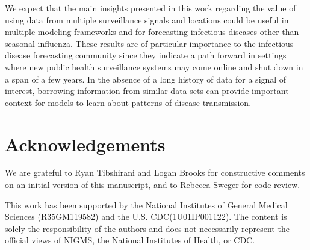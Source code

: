 \documentclass{article}\usepackage[]{graphicx}\usepackage[]{xcolor}
\begin{document}
We expect that the main insights presented in this work regarding the value of using data from multiple surveillance signals and locations could be useful in multiple modeling frameworks and for forecasting infectious diseases other than seasonal influenza. These results are of particular importance to the infectious disease forecasting community since they indicate a path forward in settings where new public health surveillance systems may come online and shut down in a span of a few years. In the absence of a long history of data for a signal of interest, borrowing information from similar data sets can provide important context for models to learn about patterns of disease transmission.

\section*{Acknowledgements}

We are grateful to Ryan Tibshirani and Logan Brooks for constructive comments on an initial version of this manuscript, and to Rebecca Sweger for code review.

This work has been supported by the National Institutes of General Medical Sciences (R35GM119582) and the U.S. CDC(1U01IP001122). The content is solely the responsibility of the authors and does not necessarily represent the official views of NIGMS, the National Institutes of Health, or CDC.

\printbibliography
\end{document}
